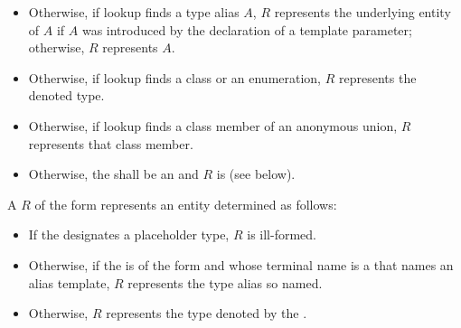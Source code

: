 \begin{itemize}
\begin{itemize}
that overload set shall contain only
declarations of a unique function template F;
$R$ represents F.
\item
Otherwise, if lookup finds
a class template, variable template, or alias template,
$R$ represents that template.
\begin{note}
Lookup never finds a partial or explicit specialization.
\end{note}
\end{itemize}
\item
Otherwise, if lookup finds a type alias $A$,
$R$ represents the underlying entity of $A$
if $A$ was introduced by the declaration of a template parameter;
otherwise, $R$ represents $A$.
\item
Otherwise, if lookup finds a class or an enumeration,
$R$ represents the denoted type.
\item
Otherwise, if lookup finds a class member of an anonymous union, $R$ represents that class member.
\item
Otherwise,
the  shall be an  
and $R$ is  (see below).
\end{itemize}

\pnum
A  $R$ of the form
represents an entity determined as follows:
\begin{itemize}
\item
If the  designates
a placeholder type,
$R$ is ill-formed.
\item
Otherwise, if the  is of the form
  
and whose terminal name is a 
that names an alias template,
$R$ represents the type alias so named.
\item
Otherwise, $R$ represents the type denoted by the .
\end{itemize}

